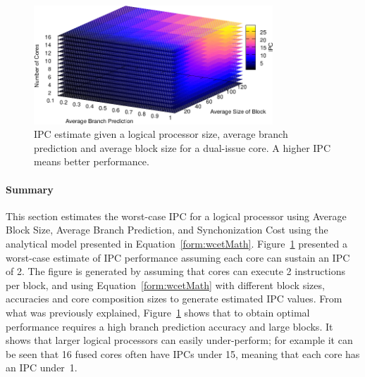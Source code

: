 \begin{figure}[t]
    \centering
    \includegraphics[width=0.8\textwidth]{cases-paper/graphics/limit_study/summary.pdf}
    \caption{IPC estimate given a logical processor size, average branch prediction and average block size for a dual-issue core. A higher IPC means better performance.}
    \label{fig:lm_summ}
\vspace{5mm}
\end{figure}

\paragraph{Summary}

This section estimates the worst-case IPC for a logical processor using Average Block Size, Average Branch Prediction, and Synchonization Cost using the analytical model presented in Equation~\ref{form:wcetMath}.
Figure~\ref{fig:lm_summ} presented a worst-case estimate of IPC performance assuming each core can sustain an IPC of 2.
The figure is generated by assuming that cores can execute 2 instructions per block, and using Equation~\ref{form:wcetMath} with different block sizes, accuracies and core composition sizes to generate estimated IPC values.
From what was previously explained, Figure~\ref{fig:lm_summ} shows that to obtain optimal performance requires a high branch prediction accuracy and large blocks.
It shows that larger logical processors can easily under-perform; for example it can be seen that 16 fused cores often have IPCs under 15, meaning that each core has an IPC under~1.

